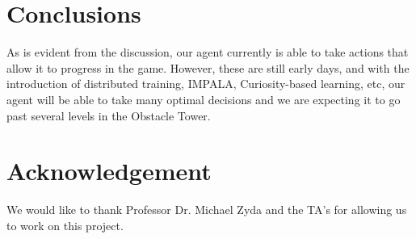 \documentclass[conference]{IEEEtran}
\begin{document}
\section{Conclusions}

As is evident from the discussion, our agent currently is able to take actions that allow it to progress in the game. However, these are still early days, and with the introduction of distributed training, IMPALA, Curiosity-based learning, etc, our agent will be able to take many optimal decisions and we are expecting it to go past several levels in the Obstacle Tower.

\section{Acknowledgement}

We would like to thank Professor Dr. Michael Zyda and the TA's for allowing us to work on this project.
\end{document}
